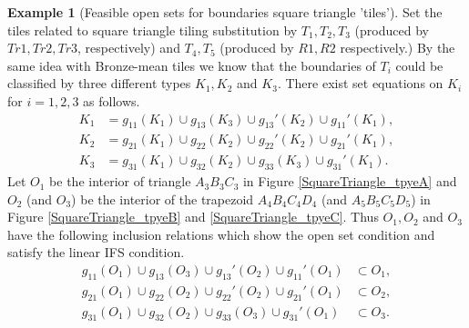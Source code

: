 \documentclass[a4]{amsart}
\theoremstyle{definition}
\newtheorem{ex}[theorem]{Example}
\begin{document}
\begin{ex}[Feasible open sets for boundaries square triangle 'tiles']
Set the tiles related to square triangle tiling substitution by $T_1, T_2, T_3$ 
(produced by $Tr1,Tr2,Tr3$, respectively) and $T_4, T_5$ (produced by $R1, R2$ respectively.) By the same idea with Bronze-mean tiles we know that the boundaries of $T_i$ could be classified by three different types $K_1,K_2$ and $K_3$. There exist set equations on $K_i$ for $i=1,2,3$ as follows.
\begin{align*}
K_1&=g_{11}(K_1)\cup g_{13}(K_3)\cup g_{13}'(K_2)\cup g_{11}'(K_1),\\
K_2&=g_{21}(K_1)\cup g_{22}(K_2)\cup g_{22}'(K_2)\cup g_{21}'(K_1),\\
K_3&=g_{31}(K_1)\cup g_{32}(K_2)\cup g_{33}(K_3)\cup g_{31}'(K_1).
\end{align*}
Let $O_1$ be the interior of triangle $A_3B_3C_3$ in Figure \ref{SquareTriangle_tpyeA} and $O_2$ (and $O_3$) be the interior of the trapezoid $A_4B_4C_4D_4$ (and $A_5B_5C_5D_5$) in Figure \ref{SquareTriangle_tpyeB} and \ref{SquareTriangle_tpyeC}.  Thus $O_1,O_2$ and $O_3$ have the following inclusion relations which show the open set condition and satisfy the linear IFS condition.
\begin{align*}
 g_{11}(O_1)\cup g_{13}(O_3)\cup g_{13}'(O_2)\cup g_{11}'(O_1)&\subset O_1,\\
g_{21}(O_1)\cup g_{22}(O_2)\cup g_{22}'(O_2)\cup g_{21}'(O_1)&\subset O_2,\\
g_{31}(O_1)\cup g_{32}(O_2)\cup g_{33}(O_3)\cup g_{31}'(O_1)&\subset O_3.
\end{align*}


\end{ex}
\end{document}
